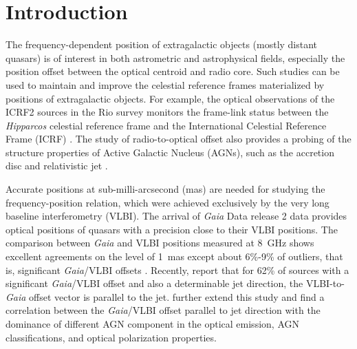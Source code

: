 \documentclass{aa}
\begin{document}

\maketitle


\section{Introduction}     \label{sec:introduction}

   The frequency-dependent position of extragalactic objects (mostly distant quasars) is of interest in both astrometric and astrophysical fields, especially the position offset between the optical centroid and radio core.
   Such studies can be used to maintain and improve the celestial reference frames materialized by positions of extragalactic objects.
   For example, the optical observations of the ICRF2 sources in the Rio survey monitors the frame-link status between the \textit{Hipparcos} celestial reference frame and the International Celestial Reference Frame (ICRF) \citep{2013MNRAS.430.2797A}.
   The study of radio-to-optical offset also provides a probing of the structure properties of Active Galactic Nucleus (AGNs), such as the accretion disc and relativistic jet \citep[e.g.,][]{2019ApJ...871..143P}.

   Accurate positions at sub-milli-arcsecond (mas) are needed for studying the frequency-position relation, which were achieved exclusively by the very long baseline interferometry (VLBI).
   The arrival of \textit{Gaia} Data release 2 \citep[\textit{Gaia} DR2;][]{2016A&A...595A...1G,2018A&A...616A...1G} data provides optical positions of quasars with a precision close to their VLBI positions.
   The comparison between \textit{Gaia} and VLBI positions measured at 8~GHz shows excellent agreements on the level of 1~mas except about 6\%-9\% of outliers, that is, significant \textit{Gaia}/VLBI offsets \citep{2016A&A...595A...5M,2018A&A...616A..14G,2017MNRAS.471.3775P,2017MNRAS.467L..71P,2017A&A...598L...1K,2017ApJ...835L..30M,2018AJ....155..229F,2019MNRAS.482.3023P,2019ApJ...871..143P,2020MNRAS.493L..54K}.
   Recently, \citet{2019MNRAS.482.3023P} report that for 62\% of sources with a significant \textit{Gaia}/VLBI offset and also a determinable jet direction, the VLBI-to-\textit{Gaia} offset vector is parallel to the jet.
   \citet{2019ApJ...871..143P,2020MNRAS.493L..54K} further extend this study and find a correlation between the \textit{Gaia}/VLBI offset parallel to jet direction with the dominance of different AGN component in the optical emission, AGN classifications, and optical polarization properties.
\end{document}
